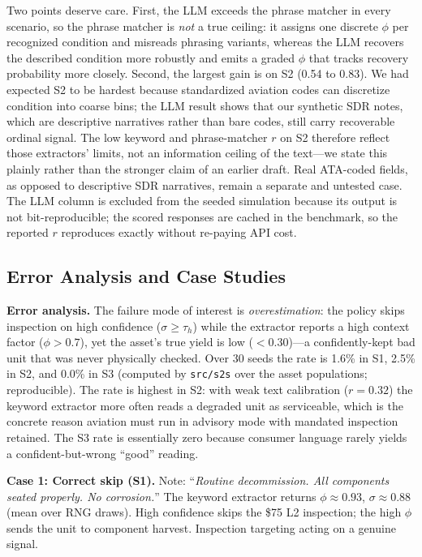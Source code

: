 \documentclass[conference]{IEEEtran}
\begin{document}
Two points deserve care. First, the LLM exceeds the phrase matcher in every
scenario, so the phrase matcher is \emph{not} a true ceiling: it assigns one
discrete $\phi$ per recognized condition and misreads phrasing variants, whereas
the LLM recovers the described condition more robustly and emits a graded $\phi$
that tracks recovery probability more closely. Second, the largest gain is on S2
(0.54 to 0.83). We had expected S2 to be hardest because standardized aviation
codes can discretize condition into coarse bins; the LLM result shows that our
synthetic SDR notes, which are descriptive narratives rather than bare codes,
still carry recoverable ordinal signal. The low keyword and phrase-matcher $r$ on
S2 therefore reflect those extractors' limits, not an information ceiling of the
text---we state this plainly rather than the stronger claim of an earlier draft.
Real ATA-coded fields, as opposed to descriptive SDR narratives, remain a separate
and untested case. The LLM column is excluded from the seeded simulation because
its output is not bit-reproducible; the scored responses are cached in the
benchmark, so the reported $r$ reproduces exactly without re-paying API cost.

\subsection{Error Analysis and Case Studies}

\noindent\textbf{Error analysis.}
The failure mode of interest is \emph{overestimation}: the policy skips
inspection on high confidence ($\sigma{\geq}\tau_h$) while the extractor reports a
high context factor ($\phi{>}0.7$), yet the asset's true yield is low
($<0.30$)---a confidently-kept bad unit that was never physically checked. Over
30 seeds the rate is 1.6\% in S1, 2.5\% in S2, and 0.0\% in S3 (computed by
\texttt{src/s2s} over the asset populations; reproducible). The rate is highest in
S2: with weak text calibration ($r{=}0.32$) the keyword extractor more often reads
a degraded unit as serviceable, which is the concrete reason aviation must run in
advisory mode with mandated inspection retained. The S3 rate is essentially zero
because consumer language rarely yields a confident-but-wrong ``good'' reading.

\smallskip\noindent\textbf{Case 1: Correct skip (S1).}
Note: ``\textit{Routine decommission. All components seated properly. No
corrosion.}'' The keyword extractor returns $\phi{\approx}0.93$,
$\sigma{\approx}0.88$ (mean over RNG draws). High confidence skips the \$75 L2
inspection; the high $\phi$ sends the unit to component harvest. Inspection
targeting acting on a genuine signal.
\end{document}
